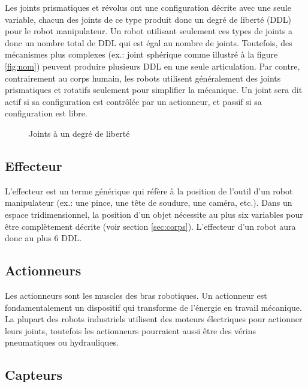 Les joints prismatiques et révolus ont une configuration décrite avec une seule variable, chacun des joints de ce type produit donc un degré de liberté (DDL) pour le robot manipulateur. Un robot utilisant seulement ces types de joints a donc un nombre total de DDL qui est égal au nombre de joints. Toutefois, des mécanismes plus complexes (ex.: joint sphérique comme illustré à la figure \ref{fig:nom}) peuvent produire plusieurs DDL en une seule articulation. Par contre, contrairement au corps humain, les robots utilisent généralement des joints prismatiques et rotatifs seulement pour simplifier la mécanique. Un joint sera dit actif si sa configuration est contrôlée par un actionneur, et passif si sa configuration est libre.
\begin{figure}[H]
	\centering
	\caption{Joints à un degré de liberté}
	\label{fig:joint}
\end{figure}

\subsection{Effecteur}

L'effecteur est un terme générique qui réfère à la position de l'outil d'un robot manipulateur (ex.: une pince, une tête de soudure, une caméra, etc.). Dans un espace tridimensionnel, la position d'un objet nécessite au plus six variables pour être complètement décrite (voir section \ref{sec:corps}). L'effecteur d'un robot aura donc au plus 6 DDL.

\subsection{Actionneurs}

Les actionneurs sont les muscles des bras robotiques. Un actionneur est fondamentalement un dispositif qui transforme de l'énergie en travail mécanique. La plupart des robots industriels utilisent des moteurs électriques pour actionner leurs joints, toutefois les actionneurs pourraient aussi être des vérins pneumatiques ou hydrauliques.

\subsection{Capteurs}

